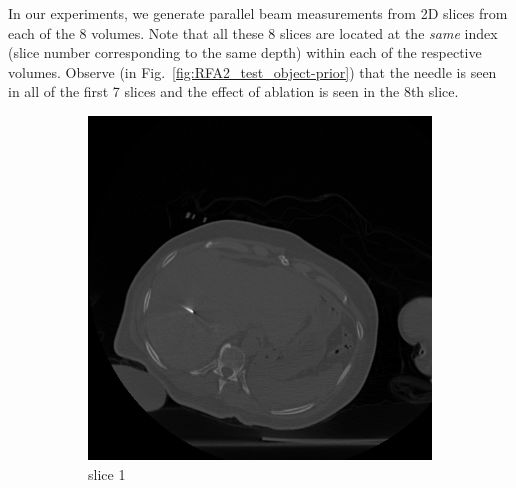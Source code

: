 \documentclass[journal]{IEEEtran}
\begin{document}
In our experiments, we generate parallel beam measurements from 2D
slices from each of the 8 volumes. Note that all these 8 slices are
located at the \emph{same} index (slice number corresponding to the
same depth) within each of the respective volumes.  Observe (in
Fig.~\ref{fig:RFA2_test_object-prior}) that the needle is seen in all
of the first 7 slices and the effect of ablation is seen in the 8th
slice.
\begin{figure}[h!]
    \begin{subfigure}[b]{0.24\linewidth}
        \includegraphics[width=\textwidth]{../images/tmh/RFA2/template1.png}
 \caption{slice 1}
    \end{subfigure}
    \begin{subfigure}[b]{0.24\linewidth}

\end{subfigure}
\end{figure}
\end{document}
